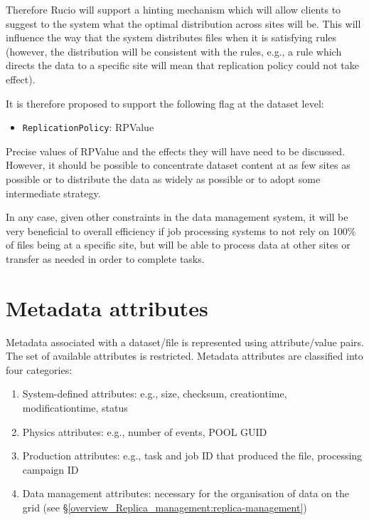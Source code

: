 \documentclass{atlasnote}
\newcommand{\code}[1]{\texttt{#1}}
\begin{document}
Therefore Rucio will support a hinting mechanism which will allow
clients to suggest to the system what the optimal distribution across
sites will be. This will influence the way that the system distributes
files when it is satisfying rules (however, the distribution will be
consistent with the rules, e.g., a rule which directs the data to a
specific site will mean that replication policy could not take effect).

It is therefore proposed to support the following flag at the dataset level:

\begin{itemize}
\item {} 
\code{ReplicationPolicy}: RPValue
\end{itemize}

Precise values of RPValue and the effects they will have need to be
discussed. However, it should be possible to concentrate dataset
content at as few sites as possible or to distribute the data as
widely as possible or to adopt some intermediate strategy. 

In any case, given other constraints in the data management system, it
will be very beneficial to overall efficiency if job processing
systems to not rely on 100\% of files being at a specific site, but
will be able to process data at other sites or transfer as needed in
order to complete tasks.


\section{Metadata attributes}
\label{overview_metadata_attributes:metadata-attributes}\label{overview_metadata_attributes::doc}
Metadata associated with a dataset/file is represented using
attribute/value pairs.  The set of available attributes is
restricted. Metadata attributes are classified into four categories:
\begin{enumerate}
\item System-defined attributes: e.g., size, checksum, creationtime,
  modificationtime, status

\item Physics attributes: e.g., number of events, 
  POOL GUID

\item Production attributes: e.g., task
  and job ID that produced the file, processing campaign ID

\item Data management attributes: necessary for the organisation of
  data on the grid (see \S\ref{overview_Replica_management:replica-management})

\end{enumerate}
\end{document}
